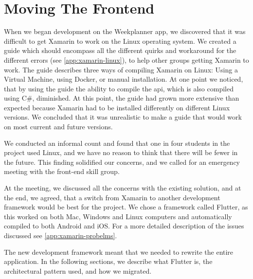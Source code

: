 \section{Moving The Frontend}\label{sec:MovingTheFrontend}

When we began development on the Weekplanner app, we discovered that it was difficult to get Xamarin to work on the Linux operating system. We created a guide which should encompass all the different quirks and workaround for the different errors (see \autoref{app:xamarin-linux}), to help other groups getting Xamarin to work. The guide describes three ways of compiling Xamarin on Linux: Using a Virtual Machine, using Docker, or manual installation. At one point we noticed, that by using the guide the ability to compile the \gls{api}, which is also compiled using C\#, diminished. At this point, the guide had grown more extensive than expected because Xamarin had to be installed differently on different Linux versions. We concluded that it was unrealistic to make a guide that would work on most current and future versions.

We conducted an informal count and found that one in four students in the project used Linux, and we have no reason to think that there will be fewer in the future. This finding solidified our concerns, and we called for an emergency meeting with the front-end skill group.

At the meeting, we discussed all the concerns with the existing solution, and at the end, we agreed, that a switch from Xamarin to another development framework would be best for the project. We chose a framework called Flutter\cite{flutter:website}, as this worked on both Mac, Windows and Linux computers and automatically compiled to both Android and iOS. For a more detailed description of the issues discussed see \autoref{app:xamarin-probelms}.

The new development framework meant that we needed to rewrite the entire application. In the following sections, we describe what Flutter is, the architectural pattern used, and how we migrated.
